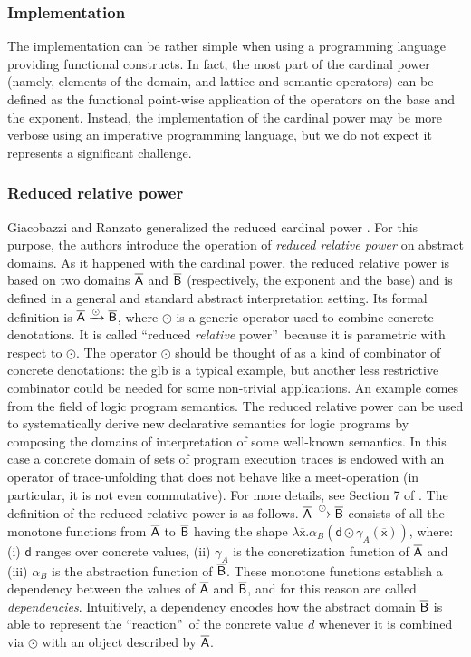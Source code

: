 \documentclass[submission,copyright,creativecommons]{eptcs}
\newcommand{\cel}[1]{\ensuremath{\mathsf{#1}}}
\newcommand{\ael}[1]{\cel{\overline{#1}}}
\begin{document}
\subsubsection{Implementation}
The implementation can be rather simple when using a programming language providing functional constructs. In fact, the most part of the cardinal power (namely, elements of the domain, and lattice and semantic operators) can be defined as the functional point-wise application of the operators on the base and the exponent. Instead, the implementation of the cardinal power may be more verbose using an imperative programming language, but we do not expect it represents a significant challenge.


\subsubsection{Reduced relative power}
Giacobazzi and Ranzato generalized the reduced cardinal power \cite{GR99}. For this purpose, the authors introduce the operation of \emph{reduced relative power} on abstract domains. As it happened with the cardinal power, the reduced relative power is based on two domains $\mathsf{\overline{A}}$ and $\mathsf{\overline{B}}$ (respectively, the exponent and the base) and is defined in a general and standard abstract interpretation setting. Its formal definition is $\mathsf{\overline{A}} \xrightarrow{\odot} \mathsf{\overline{B}}$, where $\odot$ is a generic operator used to combine concrete denotations. It is called \textquotedblleft reduced \emph{relative} power\textquotedblright\ because it is parametric with respect to $\odot$. The operator $\odot$ should be thought of as a kind of combinator of concrete denotations: the glb is a typical example, but another less restrictive combinator could be needed for some non-trivial applications. An example comes from the field of logic program semantics. The reduced relative power can be used to systematically derive new declarative semantics for logic programs by composing the domains of interpretation of some well-known semantics. In this case a concrete domain of sets of program execution traces is endowed with an operator of trace-unfolding that does not behave like a meet-operation (in particular, it is not even commutative). For more details, see Section 7 of \cite{GR99}. The definition of the reduced relative power is as follows. $\mathsf{\overline{A}} \xrightarrow{\odot} \mathsf{\overline{B}}$ consists of all the monotone functions from $\mathsf{\overline{A}}$ to $\mathsf{\overline{B}}$ having the shape $\lambda \ael{x} . \alpha_B(\cel{d} \odot \gamma_A(\ael{x}))$, where: (i) $\cel{d}$ ranges over concrete values, (ii) $\gamma_A$ is the concretization function of $\mathsf{\overline{A}}$ and (iii) $\alpha_B$ is the abstraction function of $\mathsf{\overline{B}}$. These monotone functions establish a dependency between the values of $\mathsf{\overline{A}}$ and $\mathsf{\overline{B}}$, and for this reason are called \emph{dependencies}. Intuitively, a dependency encodes how the abstract domain $\mathsf{\overline{B}}$ is able to represent the \textquotedblleft reaction\textquotedblright\ of the concrete value $d$ whenever it is combined via $\odot$ with an object described by $\mathsf{\overline{A}}$.
\end{document}
